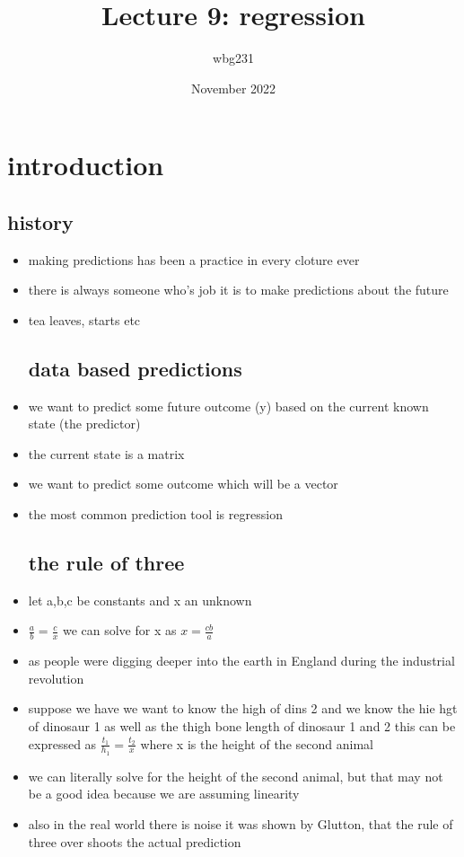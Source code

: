 \documentclass{article}
\title{Lecture 9: regression  }
\author{wbg231 }
\date{November 2022}
\begin{document}
\maketitle

\section{introduction}
\subsection{history}
\begin{itemize}
\item making predictions has been a practice in every cloture ever
\item there is always someone who's job it is to make predictions about the future 
\item tea leaves, starts etc 
\subsection{data based predictions}
\item we want to predict some future outcome (y) based on the current known state (the predictor) 
\item the current state is a matrix 
\item we want to predict some outcome which will be a vector 
\item the most common prediction tool is regression 
\subsection{the rule of three}
\item let a,b,c be constants and x an unknown 
\item $\frac{a}{b}=\frac{c}{x}$ we can solve for x as $x=\frac{cb}{a}$
\item as people were digging deeper into the earth in England during the industrial revolution 
\item suppose we have we want to know the high of dins 2 and we know the hie hgt of dinosaur 1 as well as the thigh bone length of dinosaur 1 and 2 this can be expressed as $\frac{t_1}{h_1}=\frac{t_2}{x}$ where x is the height of the second animal 
\item we can literally solve for the height of the second animal, but that may not be a good idea because we are assuming linearity
\item also in the real world there is noise 
\itme it was shown by Glutton, that the rule of three over shoots the actual prediction 

\end{itemize}
\end{document}
